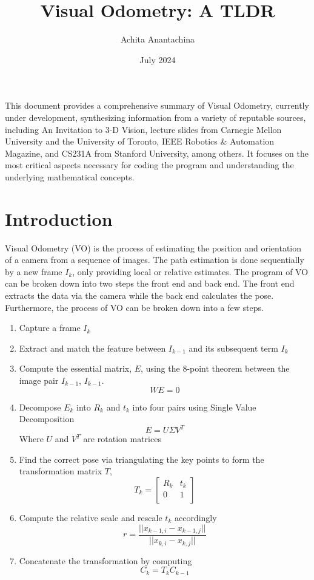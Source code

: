 \documentclass{article}
\title{Visual Odometry: A TLDR}
\author{Achita Anantachina}
\date{July 2024}
\begin{document}
\maketitle
This document provides a comprehensive summary of Visual Odometry, currently under development, synthesizing information from a variety of reputable sources, including An Invitation to 3-D Vision, lecture slides from Carnegie Mellon University and the University of Toronto, IEEE Robotics \& Automation Magazine, and CS231A from Stanford University, among others. It focuses on the most critical aspects necessary for coding the program and understanding the underlying mathematical concepts.
\tableofcontents
\thispagestyle{empty}

\newpage

\section{Introduction}
Visual Odometry (VO) is the process of estimating the position and orientation of a camera from a sequence of images. The path estimation is done sequentially by a new frame $I_k$, only providing local or relative estimates. The program of VO can be broken down into two steps the front end and back end. The front end extracts the data via the camera while the back end calculates the pose. Furthermore, the process of VO can be broken down into a few steps.
\vspace{0.75cm}
\begin{tcolorbox}[enhanced,breakable, colback=purple!5!white,colframe=purple!75!black, title=Process of Visual Odometry, drop shadow=black!40!white]
\begin{enumerate}
\item Capture a frame $I_k$
\item Extract and match the feature between $I_{k-1}$ and its subsequent term $I_k$
\item Compute the essential matrix, $E$, using the 8-point theorem between the image pair $I_{k-1}$, $I_{k-1}$.
$$WE=0$$
\item Decompose $E_k$ into $R_k$ and $t_k$ into four pairs using Single Value Decomposition
 $$E = U\Sigma V^T$$
Where $U$ and $V^T$ are rotation matrices\\
\item Find the correct pose via triangulating the key points to form the transformation matrix $T$,
$$T_k = \begin{bmatrix}
   R_k & t_k  \\
    0 & 1 \\
\end{bmatrix}$$
\item Compute the relative scale and rescale $t_k$ accordingly
$$r =\frac{||x_{k-1, i} - x_{k-1,j}||}{||x_{k, i} - x_{k,j}||}$$
\item Concatenate the transformation by computing
$$C_k =T_kC_{k-1}$$
\end{enumerate}
\end{tcolorbox}
\newpage
\end{document}
